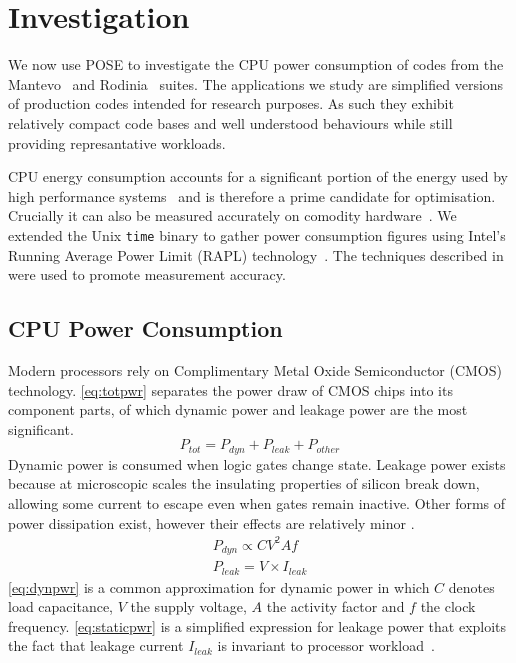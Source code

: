\section{Investigation}
\label{sec:investigation}
We now use POSE to investigate the CPU power consumption of codes from the Mantevo~\cite{heroux:2009aa} and Rodinia~\cite{che:2009aa} suites.
The applications we study are simplified versions of production codes intended for research purposes.
As such they exhibit relatively compact code bases and well understood behaviours while still providing represantative workloads.


CPU energy consumption accounts for a significant portion of the energy used by high performance systems~\cite{rong:2010aa} and is therefore a prime candidate for optimisation.
Crucially it can also be measured accurately on comodity hardware~\cite{hackenberg:2013aa}.
We extended the Unix \texttt{time} binary to gather power consumption figures using Intel's Running Average Power Limit (RAPL) technology~\cite{david:2010aa}.
The techniques described in \cite{hahnel:2012aa} were used to promote measurement accuracy.



\subsection{CPU Power Consumption}
\label{ssec:cpupower}
Modern processors rely on Complimentary Metal Oxide Semiconductor (CMOS) technology.
\autoref{eq:totpwr} separates the power draw of CMOS chips into its component parts, of which dynamic power and leakage power are the most significant.
\begin{equation}
\label{eq:totpwr}
P_{tot} = P_{dyn} + P_{leak} + P_{other}
\end{equation}
Dynamic power is consumed when logic gates change state.
Leakage power exists because at microscopic scales the insulating properties of silicon break down, allowing some current to escape even when gates remain inactive.
Other forms of power dissipation exist, however their effects are relatively minor \cite{kaxiras:2008aa}.
\begin{gather}
P_{dyn} \propto CV^{2}Af \label{eq:dynpwr} \\
P_{leak} = V \times I_{leak} \label{eq:staticpwr}
\end{gather}
\autoref{eq:dynpwr} is a common approximation for dynamic power in which $C$ denotes load capacitance, $V$ the supply voltage, $A$ the activity factor and $f$ the clock frequency.
\autoref{eq:staticpwr} is a simplified expression for leakage power that exploits the fact that leakage current $I_{leak}$ is invariant to processor workload~\cite{kim:2003aa}.

